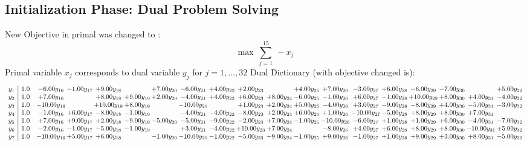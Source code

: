 \documentclass[9pt]{article}
\begin{document}
\subsection{Initialization Phase: Dual Problem Solving}
New Objective in primal was changed to : \[ \max\ \sum_{j=1}^{15}\ - x_j \] 
Primal variable $x_j$ corresponds to dual variable $y_j$ for $j = 1,\ldots,32$
Dual Dictionary (with objective changed is): 
\[\begin{array}{c| c c@{\hskip 2pt} c@{\hskip 2pt} c@{\hskip 2pt} c@{\hskip 2pt} c@{\hskip 2pt} c@{\hskip 2pt} c@{\hskip 2pt} c@{\hskip 2pt} c@{\hskip 2pt} c@{\hskip 2pt} c@{\hskip 2pt} c@{\hskip 2pt} c@{\hskip 2pt} c@{\hskip 2pt} c@{\hskip 2pt} c@{\hskip 2pt} c@{\hskip 2pt} }
 y_{1}   &  1.0 & -6.00 y_{16} & -1.00 y_{17} & +  9.00 y_{18} &   & +  7.00 y_{20} & -6.00 y_{21} & +  4.00 y_{22} & +  2.00 y_{23} &   & +  4.00 y_{25} & +  7.00 y_{26} & -3.00 y_{27} & +  6.00 y_{28} & -6.00 y_{29} & -7.00 y_{30} &   & +  5.00 y_{32}\\
 y_{2}   &  1.0 & +  7.00 y_{16} &   & +  8.00 y_{18} & +  9.00 y_{19} & +  2.00 y_{20} & -4.00 y_{21} & +  4.00 y_{22} & +  6.00 y_{23} & +  8.00 y_{24} & -6.00 y_{25} & -1.00 y_{26} & +  6.00 y_{27} & -1.00 y_{28} & + 10.00 y_{29} & +  8.00 y_{30} & +  4.00 y_{31} & -4.00 y_{32}\\
 y_{3}   &  1.0 & -10.00 y_{16} &   & + 10.00 y_{18} & +  8.00 y_{19} &   & -10.00 y_{21} &   & +  1.00 y_{23} & +  2.00 y_{24} & +  5.00 y_{25} & -4.00 y_{26} & +  3.00 y_{27} & -9.00 y_{28} & -8.00 y_{29} & +  4.00 y_{30} & -5.00 y_{31} & -3.00 y_{32}\\
 y_{4}   &  1.0 & -1.00 y_{16} & +  6.00 y_{17} & -8.00 y_{18} & -1.00 y_{19} &   & -4.00 y_{21} & -4.00 y_{22} & -8.00 y_{23} & +  2.00 y_{24} & +  6.00 y_{25} & +  1.00 y_{26} & -10.00 y_{27} & -5.00 y_{28} & +  8.00 y_{29} & +  8.00 y_{30} & +  7.00 y_{31} &   \\
 y_{5}   &  1.0 & +  7.00 y_{16} & +  9.00 y_{17} & +  2.00 y_{18} & -9.00 y_{19} & -5.00 y_{20} & -5.00 y_{21} & -9.00 y_{22} & -2.00 y_{23} & +  7.00 y_{24} & -1.00 y_{25} & -10.00 y_{26} & -6.00 y_{27} & +  1.00 y_{28} & +  1.00 y_{29} & +  6.00 y_{30} & -4.00 y_{31} & -7.00 y_{32}\\
 y_{6}   &  1.0 & -2.00 y_{16} & -1.00 y_{17} & -5.00 y_{18} & -1.00 y_{19} &   & +  3.00 y_{21} & -4.00 y_{22} & + 10.00 y_{23} & +  7.00 y_{24} &   & -8.00 y_{26} & +  4.00 y_{27} & +  6.00 y_{28} & +  8.00 y_{29} & +  8.00 y_{30} & -10.00 y_{31} & +  5.00 y_{32}\\
 y_{7}   &  1.0 & -10.00 y_{16} & +  5.00 y_{17} & +  6.00 y_{18} &   & -1.00 y_{20} & -10.00 y_{21} & -1.00 y_{22} & -5.00 y_{23} & -9.00 y_{24} & -1.00 y_{25} & +  9.00 y_{26} & -1.00 y_{27} & +  1.00 y_{28} & +  9.00 y_{29} & +  3.00 y_{30} & +  8.00 y_{31} & -5.00 y_{32}\\

\end{array}\]
\end{document}
